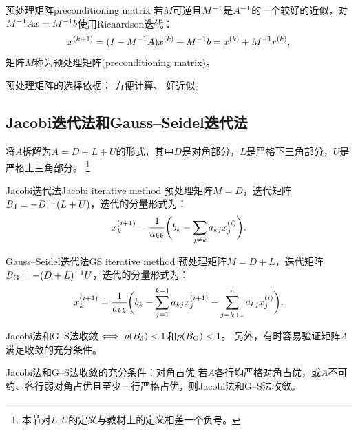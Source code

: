 \begin{definition}
    {预处理矩阵}{preconditioning matrix}
    若$M$可逆且$M^{-1}$是$A^{-1}$的一个较好的近似，对$M^{-1} Ax = M^{-1} b$使用Richardson迭代：
    \begin{equation}
        x^{(k+1)} = (I - M^{-1} A)x^{(k)} + M^{-1} b = x^{(k)} + M^{-1} r^{(k)},
    \end{equation}
    矩阵$M$称为预处理矩阵(preconditioning matrix)。
\end{definition}

\begin{remark}
    预处理矩阵的选择依据：
    方便计算、
    好近似。
\end{remark}

\subsection{Jacobi迭代法和Gauss--Seidel迭代法}

将$A$拆解为$A = D + L + U$的形式，其中$D$是对角部分，$L$是严格下三角部分，$U$是严格上三角部分。
\footnote{本节对$L,U$的定义与教材上的定义相差一个负号。}

\begin{example}
    {Jacobi迭代法}{Jacobi iterative method}
    预处理矩阵$M = D$，迭代矩阵$B_\text J = -D^{-1}(L + U)$，迭代的分量形式为：
    \begin{equation}
        x_k^{(i+1)} = \frac1{a_{kk}}\biggl(b_k - \sum_{j\neq k}a_{kj}x_j^{(i)}\biggr).
    \end{equation}
\end{example}

\begin{example}
    {Gauss--Seidel迭代法}{GS iterative method}
    预处理矩阵$M = D + L$，迭代矩阵$B_\text G = -(D + L)^{-1} U$，迭代的分量形式为：
    \begin{equation}
        x_k^{(i+1)} = \frac1{a_{kk}}\biggl(b_k - \sum_{j=1}^{k-1}a_{kj}x_j^{(i+1)} - \sum_{j=k+1}^na_{kj}x_j^{(i)}\biggr).
    \end{equation}
\end{example}

\begin{remark}
    Jacobi法和G--S法收敛$\iff \rho(B_\text J) < 1$和$\rho(B_\text G) < 1$。
    另外，有时容易验证矩阵$A$满足收敛的充分条件。
\end{remark}

\begin{theorem}
    {Jacobi法和G--S法收敛的充分条件：对角占优}{}
    若$A$各行均严格对角占优，或$A$不可约、各行弱对角占优且至少一行严格占优，则Jacobi法和G--S法收敛。
\end{theorem}


